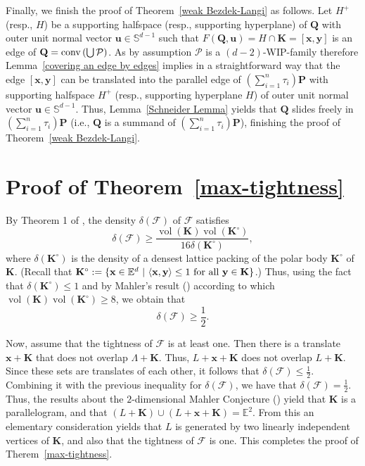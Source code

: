 \documentclass[12pt]{article}
\DeclareMathOperator{\vol}{vol}
\newcommand{\xx}{\mathbf{x}}
\newcommand{\KK}{\mathbf K}
\newcommand{\Sd}{\mathbb{S}^{d-1}}
\newcommand{\Ee}{{\mathbb E}}
\newcommand{\F}{\mathcal{F}}
\begin{document}
Finally, we finish the proof of Theorem~\ref{weak Bezdek-Langi} as follows.  Let $H^+$ (resp., $H$) be a supporting halfspace (resp., supporting hyperplane) of $\mathbf{Q}$ with outer unit normal vector $\mathbf{u}\in\Sd$ such that $F(\mathbf{Q}, \mathbf{u})=H\cap\mathbf{K}=[\mathbf{x},\mathbf{y}]$ is an edge of $\mathbf{Q}={\rm conv}\left(\bigcup  \mathcal{P}\right)$. As by assumption $\mathcal{P}$ is a $(d-2)$-WIP-family therefore Lemma~\ref{covering an edge by edges} implies in a straightforward way that the edge $[\mathbf{x},\mathbf{y}]$ can be translated into the parallel edge of $\left( \sum_{i=1}^n \tau_i \right) \mathbf{P}$ with supporting halfspace $H^+$ (resp., supporting hyperplane $H$) of outer unit normal vector $\mathbf{u}\in\Sd$. Thus, Lemma~\ref{Schneider Lemma} yields that $\mathbf{Q}$ slides freely in $\left( \sum_{i=1}^n \tau_i \right) \mathbf{P}$ (i.e., $\mathbf{Q}$ is a summand of $\left( \sum_{i=1}^n \tau_i \right) \mathbf{P}$), finishing the proof of 
Theorem~\ref{weak Bezdek-Langi}.






\section{Proof of Theorem~\ref{max-tightness}}

By Theorem 1 of \cite{Ma78}, the density $\delta(\F)$ of $\F$ satisfies
\begin{equation}\label{eq:Makai}
\delta(\F) \geq \frac{\vol(\KK)\vol(\KK^{\circ})}{16 \delta(\KK^{\circ})},
\end{equation}
where $\delta(\KK^{\circ})$ is the density of a densest lattice packing of the polar body $\KK^{\circ}$ of $\KK$. (Recall that $\mathbf{K}^\circ:=\{\mathbf{x}\in \Ee^d\ |\ \langle\mathbf{x},\mathbf{y}\rangle\leq 1 \ {\rm for \ all}\ \mathbf{y}\in \mathbf{K}  \}$.) Thus, using the fact that $\delta(\KK^{\circ}) \leq 1$ and by Mahler's result (\cite{GoSc}) according to which $\vol(\KK) \vol(\KK^{\circ}) \geq 8$, we obtain that
\[
\delta(\F) \geq \frac{1}{2}.
\]

Now, assume that the tightness of $\F$ is at least one. Then there is a translate $\xx + \KK$ that does not overlap $\Lambda + \KK$. Thus, $L + \xx + \KK$ does not overlap $L + \KK$. Since these sets are translates of each other, it follows that $\delta(\F) \leq \frac{1}{2}$. Combining it with the previous inequality for $\delta(\F)$, we have that $\delta(\F) = \frac{1}{2}$. Thus, the results about the $2$-dimensional Mahler Conjecture (\cite{GoSc}) yield that $\KK$ is a parallelogram, and that $(L + \KK) \cup (L + \xx + \KK) = \Ee^2$. From this an elementary consideration yields that $L$ is generated by two linearly independent vertices of $\KK$, and also that the tightness of $\F$ is one. This completes the proof of Therem~\ref{max-tightness}.
\end{document}
